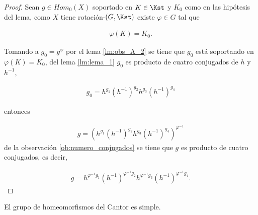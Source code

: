 \begin{proof}
Sean $g \in Hom_0(X)$ soportado en $K \in \Kst$ y $K_0$ como en las hipótesis del lema, como $X$ tiene rotación-$(G,\Kst)$  existe $\varphi \in G$ tal que 

\begin{align*}
    \varphi(K) = K_0.
\end{align*}

Tomando a $g_0= g^{\varphi}$ por el lema \ref{lm:obs_A_2} se tiene que $g_0$ está soportando en $\varphi(K)=K_0$, del lema  \ref{lm:lema_1} $g_0$ es producto de cuatro conjugados de $h$ y $h^{-1}$,

\begin{align*}
g_0= h^{g_1}(h^{-1})^{g_2}h^{g_3}(h^{-1})^{g_4}
\end{align*}

 entonces
 
\begin{align*}
 g= \left( h^{g_1}(h^{-1})^{g_2}h^{g_3}(h^{-1})^{g_4} \right)^{\varphi^{-1}}
\end{align*}
 de la observación \ref{ob:numero_conjugados} se tiene que $g$ es producto de cuatro conjugados, es decir, 
 
 \begin{align*}
 g= h^{\varphi^{-1}g_1}(h^{-1})^{\varphi^{-1}g_2}h^{\varphi^{-1}g_3}(h^{-1})^{\varphi^{-1}g_4} .
\end{align*}
\end{proof}

\begin{co}
El grupo de homeomorfismos del Cantor es simple. 
\end{co}









%
%	
%	
%


%	
%
%
%
%
%
%
%
%
%

